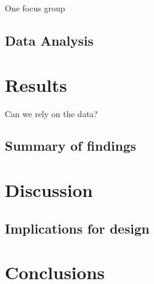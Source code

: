 \documentclass{sigchi}
\begin{document}
One focus group

\subsection{Data Analysis}


\section{Results}

Can we rely on the data?

\subsection{Summary of findings}


\section{Discussion}

\subsection{Implications for design}


\section{Conclusions}




\end{document}
